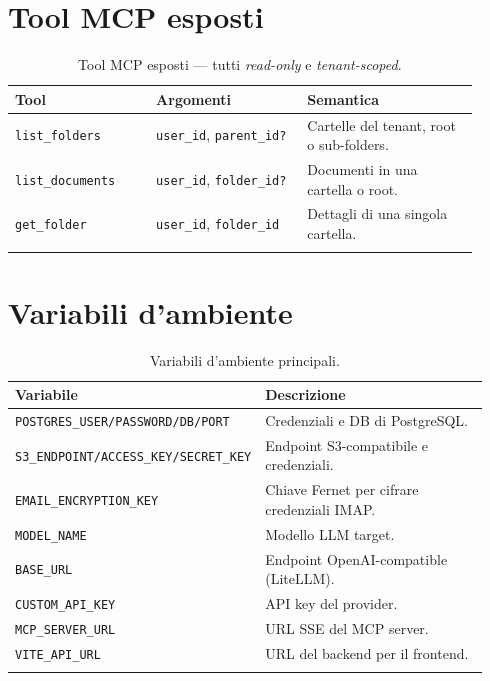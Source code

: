 \documentclass[11pt,a4paper,oneside]{article}
\begin{document}
\section{Tool MCP esposti}
\begin{longtable}{p{0.28\linewidth} p{0.30\linewidth} p{0.34\linewidth}}
\toprule
\textbf{Tool} & \textbf{Argomenti} & \textbf{Semantica} \\
\midrule
\endhead
\texttt{list\_folders}   & \texttt{user\_id}, \texttt{parent\_id?} & Cartelle del tenant, root o sub-folders. \\
\texttt{list\_documents} & \texttt{user\_id}, \texttt{folder\_id?} & Documenti in una cartella o root. \\
\texttt{get\_folder}     & \texttt{user\_id}, \texttt{folder\_id}  & Dettagli di una singola cartella. \\
\bottomrule
\caption{Tool MCP esposti — tutti \emph{read-only} e \emph{tenant-scoped}.}
\label{tab:mcp-tools}
\end{longtable}

\section{Variabili d'ambiente}
\begin{longtable}{p{0.32\linewidth} p{0.62\linewidth}}
\toprule
\textbf{Variabile} & \textbf{Descrizione} \\
\midrule
\endhead
\texttt{POSTGRES\_USER/PASSWORD/DB/PORT}  & Credenziali e DB di PostgreSQL. \\
\texttt{S3\_ENDPOINT/ACCESS\_KEY/SECRET\_KEY} & Endpoint S3-compatibile e credenziali. \\
\texttt{EMAIL\_ENCRYPTION\_KEY}            & Chiave Fernet per cifrare credenziali IMAP. \\
\texttt{MODEL\_NAME}                       & Modello LLM target. \\
\texttt{BASE\_URL}                         & Endpoint OpenAI-compatible (LiteLLM). \\
\texttt{CUSTOM\_API\_KEY}                  & API key del provider. \\
\texttt{MCP\_SERVER\_URL}                  & URL SSE del MCP server. \\
\texttt{VITE\_API\_URL}                    & URL del backend per il frontend. \\
\bottomrule
\caption{Variabili d'ambiente principali.}
\label{tab:env}
\end{longtable}
\end{document}

